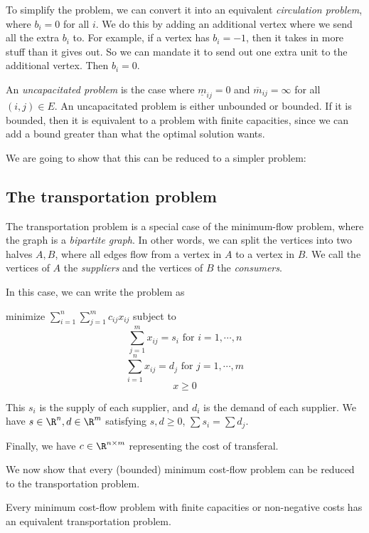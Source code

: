 \documentclass[a4paper]{article}
\begin{document}
To simplify the problem, we can convert it into an equivalent \emph{circulation problem}, where $b_i = 0$ for all $i$. We do this by adding an additional vertex where we send all the extra $b_i$ to. For example, if a vertex has $b_i = -1$, then it takes in more stuff than it gives out. So we can mandate it to send out one extra unit to the additional vertex. Then $b_i = 0$.

An \emph{uncapacitated problem} is the case where $\underline{m}_{ij} = 0$ and $\overline{m}_{ij} = \infty$ for all $(i, j) \in E$. An uncapacitated problem is either unbounded or bounded. If it is bounded, then it is equivalent to a problem with finite capacities, since we can add a bound greater than what the optimal solution wants.

We are going to show that this can be reduced to a simpler problem:

\subsection{The transportation problem}
The transportation problem is a special case of the minimum-flow problem, where the graph is a \emph{bipartite graph}. In other words, we can split the vertices into two halves $A, B$, where all edges flow from a vertex in $A$ to a vertex in $B$. We call the vertices of $A$ the \emph{suppliers} and the vertices of $B$ the \emph{consumers}.

In this case, we can write the problem as
\begin{center}
  minimize $\displaystyle\sum_{i = 1}^n\sum_{j = 1}^m c_{ij}x_{ij}$ subject to
  \[
    \sum_{j = 1}^m x_{ij} = s_i\text{ for }i = 1, \cdots, n
  \]
  \[
    \sum_{i = 1}^n x_{ij} = d_j\text{ for }j = 1, \cdots, m
  \]
  \[
    x\geq 0
  \]
\end{center}
This $s_i$ is the supply of each supplier, and $d_i$ is the demand of each supplier. We have $s\in \R^n, d\in \R^m$ satisfying $s, d\geq 0$, $\sum s_i = \sum d_j$.

Finally, we have $c\in \R^{n\times m}$ representing the cost of transferal.

We now show that every (bounded) minimum cost-flow problem can be reduced to the transportation problem.

\begin{thm}
  Every minimum cost-flow problem with finite capacities or non-negative costs has an equivalent transportation problem.
\end{thm}
\end{document}
